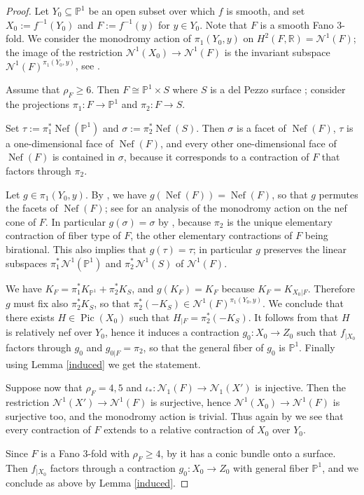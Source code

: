 \documentclass[a4paper,12pt]{amsart}
\theoremstyle{definition}
\numberwithin{figure}{section}
\numberwithin{table}{section}
\newcommand{\pr}{\mathbb{P}}
\newcommand{\R}{\mathbb{R}}
\newcommand{\N}{\mathcal{N}_1}
\newcommand{\Nu}{\mathcal{N}^1}
\newcommand{\Pic}{\operatorname{Pic}}
\newcommand{\Nef}{\operatorname{Nef}}
\begin{document}
 \begin{proof}
   Let $Y_0\subseteq\pr^1$ be an open subset over which $f$ is smooth, and set $X_0:=f^{-1}(Y_0)$ and  $F:=f^{-1}(y)$
for $y\in Y_0$.  Note that $F$ is a smooth Fano $3$-fold. We consider the monodromy action of $\pi_1(Y_0,y)$ on $H^2(F,\R)=\Nu(F)$;  the image of the restriction $\Nu(X_0)\to\Nu(F)$ is the invariant subspace $\Nu(F)^{\pi_1(Y_0,y)}$, see
\cite[Th.~16.24]{voisin}.

\medskip

   Assume that
   $\rho_F\geq 6$. Then $F\cong\pr^1\times S$ where $S$ is a del Pezzo surface \cite[\S 12.6]{fanoEMS}; consider the projections $\pi_1\colon F\to\pr^1$ and $\pi_2\colon 
   F\to S$. 

   Set $\tau:=\pi_1^*\Nef(\pr^1)$ and $\sigma:=\pi_2^*\Nef(S)$. Then
$\sigma$ is a facet of $\Nef(F)$,
   $\tau$ is a one-dimensional face of $\Nef(F)$, and every other one-dimensional face of $\Nef(F)$  is contained in $\sigma$, because it corresponds to a contraction of $F$ that factors through $\pi_2$.

Let  $g\in\pi_1(Y_0,y)$.
By \cite{wisndef,wisnrigidity}, we have $g(\Nef(F))=\Nef(F)$, so that $g$ permutes the facets of $\Nef(F)$; see \cite[\S 2]{CFST} for an analysis of the monodromy action on the nef cone of $F$. In particular
$g(\sigma)=\sigma$ by \cite[Th.~2.7]{CFST}, because $\pi_2$ is the unique elementary contraction of fiber type of $F$, the other elementary contractions of $F$ being birational. This also implies that $g(\tau)=\tau$; in particular $g$ preserves the linear subspaces $\pi_{1\,}^*\Nu(\pr^1)$ and $\pi_{2\,}^*\Nu(S)$ of $\Nu(F)$.

We have $K_F=\pi_1^*K_{\pr^1}+\pi_2^*K_S$, and $g(K_F)=K_F$ because $K_F=K_{X_0|F}$. Therefore $g$ must fix also $\pi_2^*K_S$, so that $\pi_2^*(-K_S)\in\Nu(F)^{\pi_1(Y_0,y)}$. We conclude that there exists $H\in\Pic(X_0)$ such that $H_{|F}=\pi_2^*(-K_S)$. It follows from \cite[Prop.~1.3]{wisndef}
that $H$ is relatively nef over $Y_0$, hence
it induces a contraction 
$g_0\colon X_0\to Z_0$ such that  $f_{|X_0}$ factors through $g_0$ and $g_{0|F}=\pi_2$, so that the general fiber of $g_0$ is $\pr^1$. Finally using Lemma \ref{induced} we get the statement.

\medskip

Suppose now that
$\rho_F=4,5$ and $\iota_*\colon\N(F)\to\N(X')$ is injective. Then the restriction $\Nu(X')\to\Nu(F)$ is surjective, hence  $\Nu(X_0)\to\Nu(F)$ is surjective too,
and the monodromy action is trivial. Thus again by \cite[Prop.~1.3]{wisndef}
 we see that every contraction of $F$ extends to a relative contraction of $X_0$ over $Y_0$.

 Since $F$ is a Fano $3$-fold with $\rho_F\geq 4$, by \cite[Theorem on p.~141]{fanoEMS} it has a conic bundle onto a surface. Then $f_{|X_0}$ factors through  a contraction $g_0\colon X_0\to Z_0$ with general fiber $\pr^1$, and we conclude as above by Lemma \ref{induced}.
\end{proof}
\end{document}
